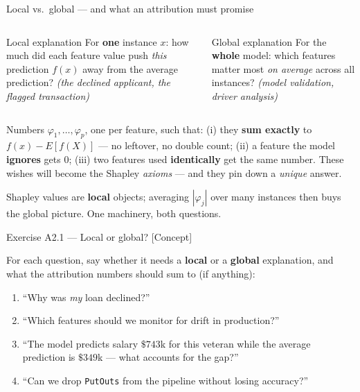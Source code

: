 \documentclass[aspectratio=169,11pt]{beamer}
\begin{document}
\begin{frame}{Local vs.\ global --- and what an attribution must promise}
  \begin{columns}[T]
    \begin{block}{Local explanation}
      For \textbf{one} instance $x$: how much did each feature value push
      \emph{this} prediction $f(x)$ away from the average prediction?
      \emph{(the declined applicant, the flagged transaction)}
    \end{block}
    \begin{block}{Global explanation}
      For the \textbf{whole} model: which features matter most \emph{on
      average} across all instances? \emph{(model validation, driver analysis)}
    \end{block}
  \end{columns}
  \vspace{2pt}
  \begin{readme}
    Numbers $\varphi_1,\dots,\varphi_p$, one per feature, such that:
    (i) they \textbf{sum exactly} to $f(x)-E[f(X)]$ --- no leftover, no double count;
    (ii) a feature the model \textbf{ignores} gets $0$;
    (iii) two features used \textbf{identically} get the same number.
    These wishes will become the Shapley \emph{axioms} --- and they pin down a
    \emph{unique} answer.
  \end{readme}
  \begin{takeaway}
    Shapley values are \textbf{local} objects; averaging $|\varphi_j|$ over many
    instances then buys the global picture. One machinery, both questions.
  \end{takeaway}
\end{frame}

\begin{frame}{Exercise A2.1 --- Local or global? [Concept]}
\begin{exercise}
  For each question, say whether it needs a \textbf{local} or a \textbf{global}
  explanation, and what the attribution numbers should sum to (if anything):
  \begin{enumerate}
    \item ``Why was \emph{my} loan declined?''
    \item ``Which features should we monitor for drift in production?''
    \item ``The model predicts salary $\$743$k for this veteran while the average
          prediction is $\$349$k --- what accounts for the gap?''
    \item ``Can we drop \texttt{PutOuts} from the pipeline without losing accuracy?''
  \end{enumerate}
\end{exercise}
\end{frame}
\end{document}
